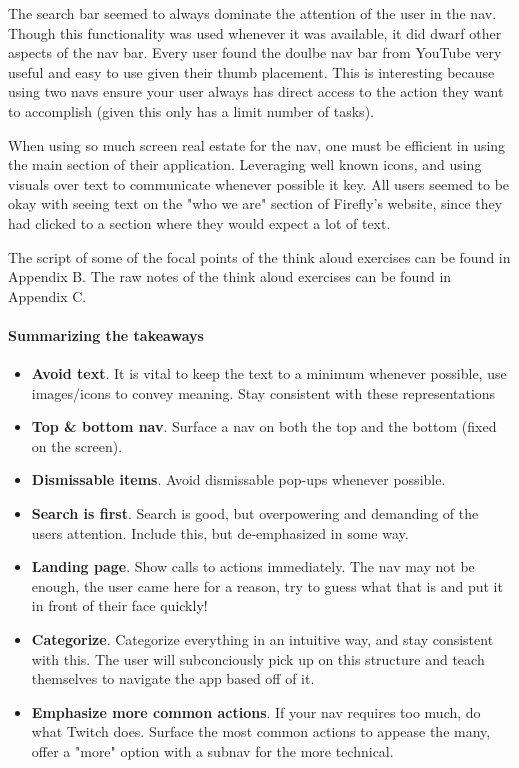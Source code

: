 \clearpage

The search bar seemed to always dominate the attention of the user in the nav. Though this functionality was used whenever it was available, it did dwarf other aspects of the nav bar. Every user found the doulbe nav bar from YouTube very useful and easy to use given their thumb placement. This is interesting because using two navs ensure your user always has direct access to the action they want to accomplish (given this only has a limit number of tasks).

When using so much screen real estate for the nav, one must be efficient in using the main section of their application. Leveraging well known icons, and using visuals over text to communicate whenever possible it key. All users seemed to be okay with seeing text on the "who we are" section of Firefly's website, since they had clicked to a section where they would expect a lot of text.

The script of some of the focal points of the think aloud exercises can be found in Appendix B. The raw notes of the think aloud exercises can be found in Appendix C.

\paragraph{Summarizing the takeaways}
\begin{itemize}
  \item
    \textbf{Avoid text}. It is vital to keep the text to a minimum whenever possible, use images/icons to convey meaning. Stay consistent with these representations
  \item
    \textbf{Top & bottom nav}. Surface a nav on both the top and the bottom (fixed on the screen).
  \item
    \textbf{Dismissable items}. Avoid dismissable pop-ups whenever possible.
  \item
    \textbf{Search is first}. Search is good, but overpowering and demanding of the users attention. Include this, but de-emphasized in some way.
  \item
    \textbf{Landing page}. Show calls to actions immediately. The nav may not be enough, the user came here for a reason, try to guess what that is and put it in front of their face quickly!
  \item
    \textbf{Categorize}. Categorize everything in an intuitive way, and stay consistent with this. The user will subconciously pick up on this structure and teach themselves to navigate the app based off of it.
  \item
    \textbf{Emphasize more common actions}. If your nav requires too much, do what Twitch does. Surface the most common actions to appease the many, offer a "more" option with a subnav for the more technical.
\end{itemize}

